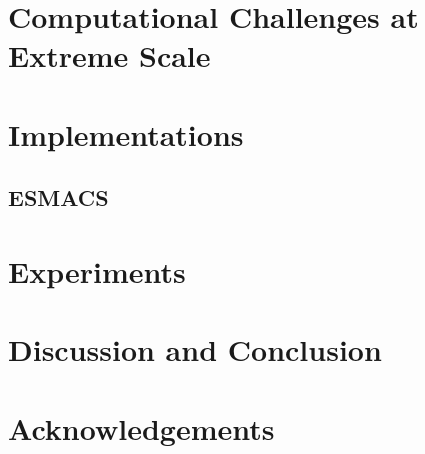 \documentclass[conference]{IEEEtran}
\begin{document}
\section{Computational Challenges at Extreme Scale}\label{sec:3}



\section{Implementations}\label{sec:4}


\subsection{ESMACS}\label{sec:htbac}



\section{Experiments}\label{sec:6}



\section{Discussion and Conclusion}\label{sec:conclusion}



\section*{Acknowledgements}





\end{document}
